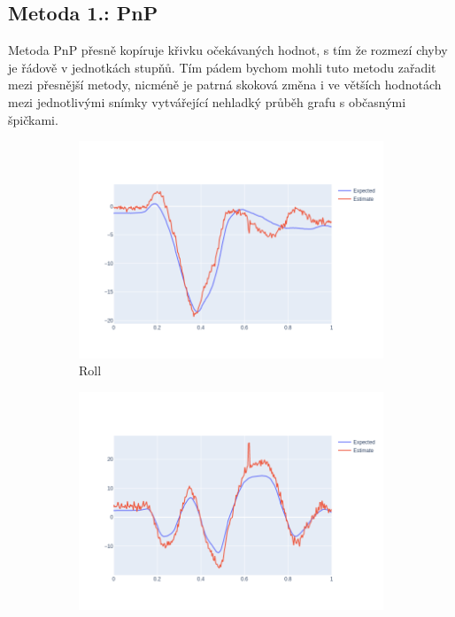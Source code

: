 \documentclass[12pt,a4paper,titlepage,final]{report}
\begin{document}
\subsection{Metoda 1.: PnP}
Metoda PnP přesně kopíruje křivku očekávaných hodnot, s tím že rozmezí chyby je řádově v jednotkách stupňů. Tím pádem bychom mohli tuto metodu zařadit mezi přesnější metody, nicméně je patrná skoková změna i ve větších hodnotách mezi jednotlivými snímky vytvářející nehladký průběh grafu s občasnými špičkami. 
\begin{figure}[!h]
  \centering
  \captionsetup{justification=centering}
  \begin{subfigure}[b]{0.32\textwidth}
    \includegraphics[width=\textwidth]{images/evaluation/3D_model_roll_user_01_video_07.png}
   \caption{Roll}
    \label{fig:pnp_roll}
  \end{subfigure}
  \hfill
  \begin{subfigure}[b]{0.32\textwidth}
    \includegraphics[width=\textwidth]{images/evaluation/3D_model_yaw_user_01_video_07.png}

\end{subfigure}
\end{figure}
\end{document}

